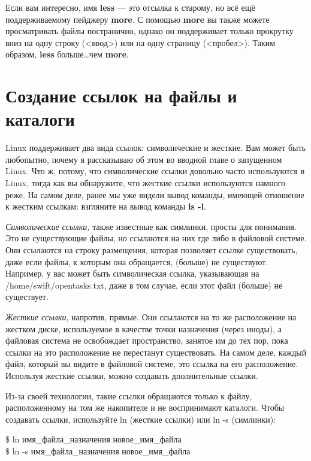 \documentclass[10pt]{book}
\begin{document}
Если вам интересно, имя \textbf{less} — это отсылка к старому, но всё ещё поддерживаемому пейджеру \textbf{more}. С помощью \textbf{more} вы также можете просматривать файлы постранично, однако он поддерживает только прокрутку вниз на одну строку (<ввод>) или на одну страницу (<пробел>). Таким образом, \textbf{less} больше\ldots чем \textbf{more}.

\section{Создание ссылок на файлы и каталоги}

Linux поддерживает два вида ссылок: символические и жесткие. Вам может быть любопытно, почему я рассказываю об этом во вводной главе о запущенном Linux. Что ж, потому, что символические ссылки довольно часто используются в Linux, тогда как вы обнаружите, что жесткие ссылки используются намного реже. На самом деле, ранее мы уже видели вывод команды, имеющей отношение к жестким ссылкам: взгляните на вывод команды \textbf{ls -l}.

\textit{Символические ссылки,} также известные как симлинки, просты для понимания. Это не существующие файлы, но ссылаются на них где либо в файловой системе. Они ссылаются на строку размещения, которая позволяет ссылке существовать, даже если файлы, к которым она обращается, (больше) не существуют. Например, у вас может быть символическая ссылка, указывающая на /home/swift/\break{}opentasks.txt, даже в том случае, если этот файл (больше) не существует.

\textit{Жесткие ссылки}, напротив, прямые. Они ссылаются на то же расположение на жестком диске, используемое в качестве точки назначения (через иноды), а файловая система не освобождает пространство, занятое им до тех пор, пока ссылки на это расположение не перестанут существовать. На самом деле, каждый файл, который вы видите в файловой системе, это ссылка на его расположение. Используя жесткие ссылки, можно создавать дполнительные ссылки.

Из-за своей технологии, такие ссылки обращаются только к файлу, расположенному на том же накопителе и не воспринимают каталоги. 
Чтобы создавать ссылки, используйте ln (жесткие ссылки) или ln -s (симлинки):

\vspace{3mm}
\begin{tcolorbox}
\$ ln имя\_файла\_назначения новое\_имя\_файла \\
\$ ln -s имя\_файла\_назначения новое\_имя\_файла
\end{tcolorbox}
\end{document}
